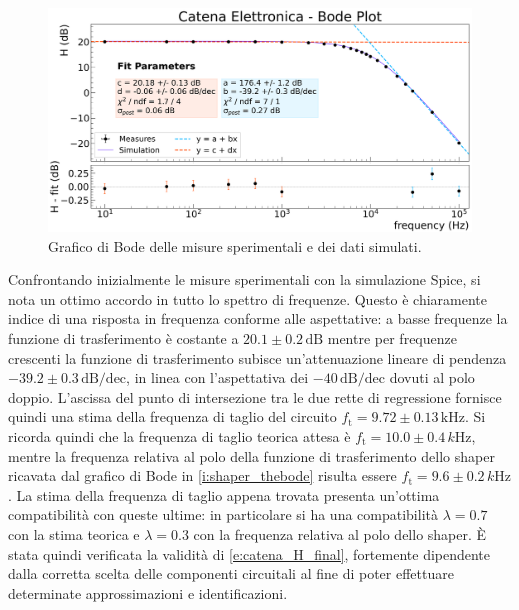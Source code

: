 \documentclass[a4paper,11pt]{article} %
\begin{document}
\begin{figure}[H] 
	\centering
	\includegraphics[width=0.8\linewidth]{../Plots/Catena/bode_plot2.png} 
	\vspace{-10pt}
	\caption{\small Grafico di Bode delle misure sperimentali e dei dati simulati.} 
	\label{i:catena_thebode} 
\end{figure} 
\vspace{-7pt}
Confrontando inizialmente le misure sperimentali con la simulazione Spice, si nota un ottimo accordo in tutto lo spettro
di frequenze. Questo è chiaramente indice di una risposta in frequenza conforme alle aspettative: a basse frequenze la
funzione di trasferimento è costante a $20.1 \pm 0.2 \,\text{dB}$ mentre per frequenze crescenti la funzione di
trasferimento subisce un'attenuazione lineare di pendenza $-39.2\pm 0.3\,\text{dB/dec}$, in linea con l'aspettativa dei
$-40\,\text{dB/dec}$ dovuti al polo doppio. L'ascissa del punto di intersezione tra le due rette di regressione fornisce
quindi una stima della frequenza di taglio del circuito $f_{\text{t}}= 9.72 \pm 0.13 \,\si{\kilo\Hz}$. Si ricorda quindi
che la frequenza di taglio teorica attesa è $f_{\text{t}} = 10.0 \pm 0.4 \,\si{k\Hz}$, mentre la frequenza relativa al
polo della funzione di trasferimento dello shaper ricavata dal grafico di Bode in \autoref{i:shaper_thebode} risulta
essere $f_{\text{t}} = 9.6 \pm 0.2 \,\si{k\Hz}$. La stima della frequenza di taglio appena trovata presenta un'ottima
compatibilità con queste ultime: in particolare si ha una compatibilità $\lambda = 0.7$ con la stima teorica e $\lambda
= 0.3$ con la frequenza relativa al polo dello shaper. È stata quindi verificata la validità di
\autoref{e:catena_H_final}, fortemente dipendente dalla corretta scelta delle componenti circuitali al fine di poter
effettuare determinate approssimazioni e identificazioni. 


\end{document}
